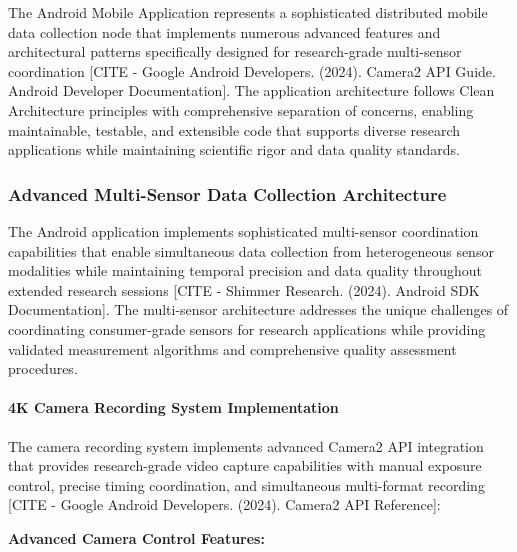 \documentclass[12pt,a4paper]{article}
\begin{document}
The Android Mobile Application represents a sophisticated distributed mobile data collection node that implements
numerous advanced features and architectural patterns specifically designed for research-grade multi-sensor
coordination [CITE - Google Android Developers. (2024). Camera2 API Guide. Android Developer Documentation]. The
application architecture follows Clean Architecture principles with comprehensive separation of concerns, enabling
maintainable, testable, and extensible code that supports diverse research applications while maintaining scientific
rigor and data quality standards.

\subsubsection{Advanced Multi-Sensor Data Collection Architecture}

The Android application implements sophisticated multi-sensor coordination capabilities that enable simultaneous data
collection from heterogeneous sensor modalities while maintaining temporal precision and data quality throughout
extended research sessions [CITE - Shimmer Research. (2024). Android SDK Documentation]. The multi-sensor architecture
addresses the unique challenges of coordinating consumer-grade sensors for research applications while providing
validated measurement algorithms and comprehensive quality assessment procedures.

\paragraph{4K Camera Recording System Implementation}

The camera recording system implements advanced Camera2 API integration that provides research-grade video capture
capabilities with manual exposure control, precise timing coordination, and simultaneous multi-format
recording [CITE - Google Android Developers. (2024). Camera2 API Reference]:

\textbf{Advanced Camera Control Features:}
\end{document}
